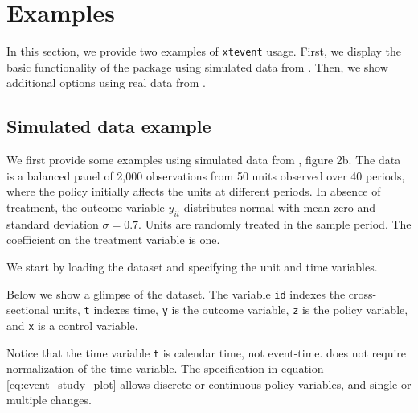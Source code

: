 \documentclass[bib]{./sty/statapress}
\begin{document}

\section{Examples} \label{sec:examples}

In this section, we provide two examples of \texttt{xtevent} usage. First, we display the basic functionality of the package using simulated data from \citet{freyaldenhoven2021visualization}. Then, we show additional options using real data from \citet{martinez2022mobility}.


\subsection{Simulated data example} \label{sec:sim}

We first provide some examples using simulated data from \citet{freyaldenhoven2021visualization}, figure 2b.
The data is a balanced panel of 2,000 observations from 50 units observed over 40 periods, where the policy initially affects the units at different periods.
In absence of treatment, the outcome variable $y_{it}$ distributes normal with mean zero and standard deviation $\sigma = 0.7$.
Units are randomly treated in the sample period.
The coefficient on the treatment variable is one.

We start by loading the dataset and specifying the unit and time variables.
\begin{stlog}
\nullskip
\end{stlog}

Below we show a glimpse of the dataset.
The variable \texttt{id} indexes the cross-sectional units, \texttt{t} indexes time, \texttt{y} is the outcome variable, \texttt{z} is the policy variable, and \texttt{x} is a control variable.

\begin{stlog}
\nullskip
\end{stlog}

Notice that the time variable \texttt{t} is calendar time, not event-time.
\xtevent does not require normalization of the time variable.
The specification in equation \eqref{eq:event_study_plot} allows discrete or continuous policy variables, and single or multiple changes.
\end{document}
